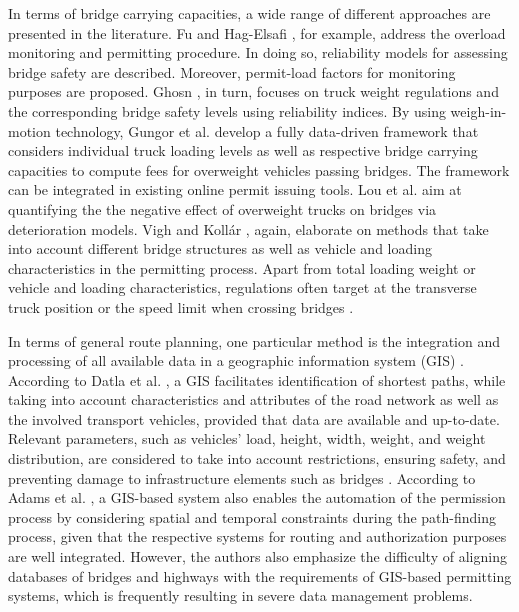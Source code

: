 \par
In terms of bridge carrying capacities, a wide range of different approaches are presented in the literature. Fu and Hag-Elsafi \cite{fu2000vehicular}, for example, address the overload monitoring and permitting procedure. In doing so, reliability models for assessing bridge safety are described. Moreover, permit-load factors for monitoring purposes are proposed. Ghosn \cite{ghosn2000development}, in turn, focuses on truck weight regulations and the corresponding bridge safety levels using reliability indices. By using weigh-in-motion technology, Gungor et al. \cite{gungor2018detect} develop a fully data-driven framework that considers individual truck loading levels as well as respective bridge carrying capacities to compute fees for overweight vehicles passing bridges. The framework can be integrated in existing online permit issuing tools. Lou et al. \cite{lou2016effect} aim at quantifying the the negative effect of overweight trucks on bridges via deterioration models. Vigh and Kollár \cite{vigh2006approximate, vigh2007routing}, again, elaborate on methods that take into account different bridge structures as well as vehicle and loading characteristics in the permitting process. Apart from total loading weight or vehicle and loading characteristics, regulations often target at the transverse truck position or the speed limit when crossing bridges \cite{yan2018optimal}.
\par
In terms of general route planning, one particular method is the integration and processing of all available data in a geographic information system (GIS) \cite{durham2002gis}.
According to Datla et al. \cite{datla2004gis}, a GIS facilitates identification of shortest paths, while taking into account characteristics and attributes of the road network as well as the involved transport vehicles, provided that data are available and up-to-date. Relevant parameters, such as vehicles' load, height, width, weight, and weight distribution, are considered to take into account restrictions, ensuring safety, and preventing damage to infrastructure elements such as bridges \cite{ecmt2006improving, vaitkus2016effect, kombe2017modelling, pauer2017development}. According to Adams et al. \cite{adams2002enterprise}, a GIS-based system also enables the automation of the permission process by considering spatial and temporal constraints during the path-finding process, given that the respective systems for routing and authorization purposes are well integrated. However, the authors also emphasize the difficulty of aligning databases of bridges and highways with the requirements of GIS-based permitting systems, which is frequently resulting in severe data management problems.
